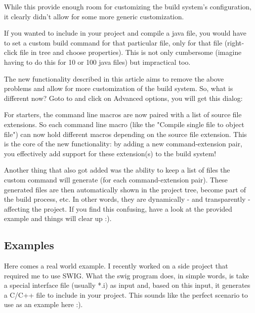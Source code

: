 While this provide enough room for customizing the build system's configuration, it clearly didn't allow for some more generic customization.\

If you wanted to include in your project and compile a java file, you would have to set a custom build command for that particular file, only for that file (right-click file in tree and choose properties). This is not only cumbersome (imagine having to do this for 10 or 100 java files) but impractical too.\


The new functionality described in this article aims to remove the above problems and allow for more customization of the build system. So, what is different now? Goto to  and click on Advanced options, you will get this dialog:


For starters, the command line macros are now paired with a list of source file extensions. So each command line macro (like the "Compile single file to object file") can now hold different macros depending on the source file extension. This is the core of the new functionality: by adding a new command-extension pair, you effectively add support for these extension(s) to the build system!\

Another thing that also got added was the ability to keep a list of files the custom command will generate (for each command-extension pair). These generated files are then automatically shown in the project tree, become part of the build process, etc. In other words, they are dynamically - and transparently - affecting the project. If you find this confusing, have a look at the provided example and things will clear up :).\

\subsection{Examples}


Here comes a real world example. I recently worked on a side project that required me to use SWIG. What the swig program does, in simple words, is take a special interface file (usually *.i) as input and, based on this input, it generates a C/C++ file to include in your project. This sounds like the perfect scenario to use as an example here :).

